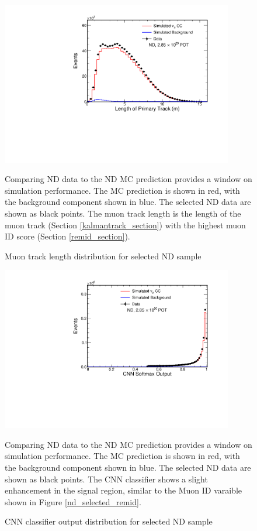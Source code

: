\begin{figure}
\begin{center}
\includegraphics[width=0.9\textwidth]{figures/selection_nd/trkLength_NumuContainND_CVN.pdf}
\end{center}
\caption{Muon track length distribution for selected ND sample}{
Comparing ND data to the ND MC prediction provides a window on simulation
performance.  The MC prediction is shown in red, with the background
component shown in blue.
The selected ND data are shown as black points.
The muon track length is the length of the muon track (Section
\ref{kalmantrack_section})
with the highest muon ID score (Section \ref{remid_section}).
}
\label{nd_selected_trkLen}
\end{figure}

\begin{figure}
\begin{center}
\includegraphics[width=0.9\textwidth]{figures/selection_nd/cvnmu_NumuContainND_CVN.pdf}
\end{center}
\caption{CNN classifier output distribution for selected ND sample}{
Comparing ND data to the ND MC prediction provides a window on simulation
performance.  The MC prediction is shown in red, with the background
component shown in blue.
The selected ND data are shown as black points.
The CNN classifier shows a slight enhancement in the signal region, similar
to the Muon ID varaible shown in Figure \ref{nd_selected_remid}.}
\label{nd_selected_cvnmu}
\end{figure}


